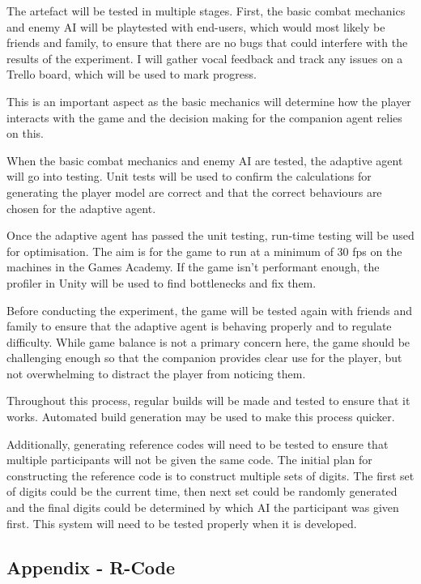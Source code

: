 \documentclass{IEEEtran}
\begin{document}

The artefact will be tested in multiple stages. First, the basic combat mechanics and enemy AI will be playtested with end-users, which would most likely be friends and family, to ensure that there are no bugs that could interfere with the results of the experiment. I will gather vocal feedback and track any issues on a Trello board, which will be used to mark progress.

This is an important aspect as the basic mechanics will determine how the player interacts with the game and the decision making for the companion agent relies on this.

When the basic combat mechanics and enemy AI are tested, the adaptive agent will go into testing. Unit tests will be used to confirm the calculations for generating the player model are correct and that the correct behaviours are chosen for the adaptive agent.

Once the adaptive agent has passed the unit testing, run-time testing will be used for optimisation. The aim is for the game to run at a minimum of 30 fps on the machines in the Games Academy. If the game isn't performant enough, the profiler in Unity will be used to find bottlenecks and fix them.

Before conducting the experiment, the game will be tested again with friends and family to ensure that the adaptive agent is behaving properly and to regulate difficulty. While game balance is not a primary concern here, the game should be challenging enough so that the companion provides clear use for the player, but not overwhelming to distract the player from noticing them.

Throughout this process, regular builds will be made and tested to ensure that it works. Automated build generation may be used to make this process quicker.

Additionally, generating reference codes will need to be tested to ensure that multiple participants will not be given the same code. The initial plan for constructing the reference code is to construct multiple sets of digits. The first set of digits could be the current time, then next set could be randomly generated and the final digits could be determined by which AI the participant was given first. This system will need to be tested properly when it is developed.

\newpage

\subsection{Appendix - R-Code}
\label{AppendixRCode}
\end{document}
